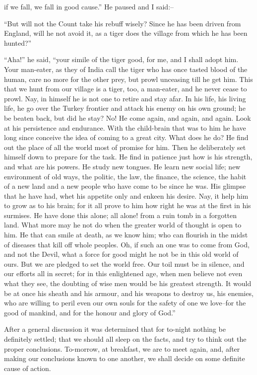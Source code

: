 \documentclass[12pt,openright]{book}
\begin{document}
if we fall, we fall in good cause.” He paused and I said:–

“But will not the Count take his rebuff wisely? Since he has been driven from England, will he not avoid it, as a tiger does the village from which he has been hunted?”

“Aha!” he said, “your simile of the tiger good, for me, and I shall adopt him. Your man-eater, as they of India call the tiger who has once tasted blood of the human, care no more for the other prey, but prowl unceasing till he get him. This that we hunt from our village is a tiger, too, a man-eater, and he never cease to prowl. Nay, in himself he is not one to retire and stay afar. In his life, his living life, he go over the Turkey frontier and attack his enemy on his own ground; he be beaten back, but did he stay? No! He come again, and again, and again. Look at his persistence and endurance. With the child-brain that was to him he have long since conceive the idea of coming to a great city. What does he do? He find out the place of all the world most of promise for him. Then he deliberately set himself down to prepare for the task. He find in patience just how is his strength, and what are his powers. He study new tongues. He learn new social life; new environment of old ways, the politic, the law, the finance, the science, the habit of a new land and a new people who have come to be since he was. His glimpse that he have had, whet his appetite only and enkeen his desire. Nay, it help him to grow as to his brain; for it all prove to him how right he was at the first in his surmises. He have done this alone; all alone! from a ruin tomb in a forgotten land. What more may he not do when the greater world of thought is open to him. He that can smile at death, as we know him; who can flourish in the midst of diseases that kill off whole peoples. Oh, if such an one was to come from God, and not the Devil, what a force for good might he not be in this old world of ours. But we are pledged to set the world free. Our toil must be in silence, and our efforts all in secret; for in this enlightened age, when men believe not even what they see, the doubting of wise men would be his greatest strength. It would be at once his sheath and his armour, and his weapons to destroy us, his enemies, who are willing to peril even our own souls for the safety of one we love–for the good of mankind, and for the honour and glory of God.”

After a general discussion it was determined that for to-night nothing be definitely settled; that we should all sleep on the facts, and try to think out the proper conclusions. To-morrow, at breakfast, we are to meet again, and, after making our conclusions known to one another, we shall decide on some definite cause of action.
\end{document}
